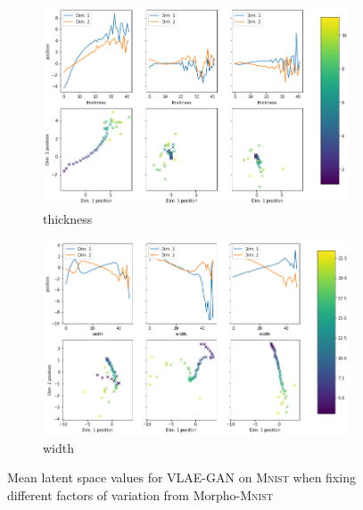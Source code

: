 \documentclass[11pt,a4paper]{article}
\begin{document}
\begin{figure}[H]
\begin{subfigure}{.48\textwidth}
\includegraphics[width=\textwidth]{images/latent_space_traversals/vlae_gan_mnist_morpho_latent_space_values_thickness.png}
\caption{thickness}
\end{subfigure}
\begin{subfigure}{.48\textwidth}
\includegraphics[width=\textwidth]{images/latent_space_traversals/vlae_gan_mnist_morpho_latent_space_values_width.png}
\caption{width}
\end{subfigure}
\caption{Mean latent space values for \ac{VLAE}-\ac{GAN} on \textsc{Mnist} when fixing different factors of variation from Morpho-\textsc{Mnist}}
\label{fig:appendix_vlae_gan_mnist_latent_space_morpho}

\end{figure}
\end{document}
